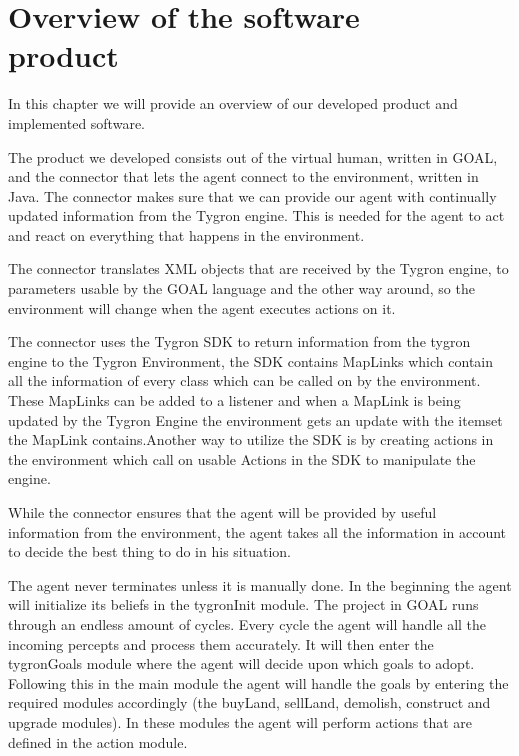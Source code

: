 \chapter[Overview of the software product]{Overview of the software \\ product}
In this chapter we will provide an overview of our developed product and implemented software.

The product we developed consists out of the virtual human, written in GOAL, and the connector that lets the agent connect to the environment, written in Java. The connector makes sure that we can provide our agent with continually updated information from the Tygron engine. This is needed for the agent to act and react on everything that happens in the environment.

The connector translates XML objects that are received by the Tygron engine, to parameters usable by the GOAL language and the other way around, so the environment will change when the agent executes actions on it.

The connector uses the Tygron SDK to return information from the tygron engine to the Tygron Environment, the SDK contains MapLinks which contain all the information of every class which can be called on by the environment. These MapLinks can be added to a listener and  when a MapLink is being updated by the Tygron Engine the environment gets an update with the itemset the MapLink contains.Another way to utilize the SDK is by creating actions in the environment which call on usable Actions in the SDK to manipulate the engine. 

While the connector ensures that the agent will be provided by useful information from the environment, the agent takes all the information in account to decide the best thing to do in his situation. 

The agent never terminates unless it is manually done. In the beginning the agent will initialize its beliefs in the tygronInit module. The project in GOAL runs through an endless amount of cycles. Every cycle the agent will handle all the incoming percepts and process them accurately. It will then enter the tygronGoals module where the agent will decide upon which goals to adopt. Following this in the main module the agent will handle the goals by entering the required modules accordingly (the buyLand, sellLand, demolish, construct and upgrade modules). In these modules the agent will perform actions that are defined in the action module.
\newpage
